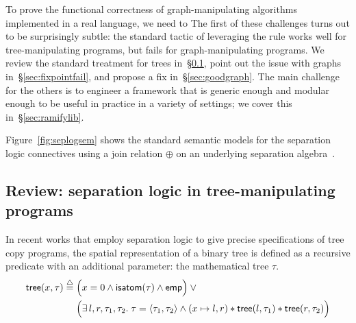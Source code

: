 

To prove the functional correctness of graph-manipulating algorithms implemented in a real language, we need to   
The first of these challenges turns out to be surprisingly subtle: 
the standard tactic of leveraging the  rule 
works well for tree-manipulating programs, but fails for graph-manipulating programs.
We review the standard treatment for trees in~\S\ref{sec:seplogtrees}, 
point out the issue with graphs in~\S\ref{sec:fixpointfail},
and propose a fix in~\S\ref{sec:goodgraph}.  
The main challenge for the others is to engineer a framework that is generic 
enough and modular enough to be useful in practice in a variety of settings; 
we cover this in~\S\ref{sec:ramifylib}.



Figure~\ref{fig:seplogsem} shows the standard semantic models for the separation logic connectives using a join relation $\oplus$ on an underlying separation algebra~\cite{dockins09}.

\subsection{\color{red} Review: separation logic in tree-manipulating programs}
\label{sec:seplogtrees}

In recent works \citep{o2001local, o2012primer}
that employ separation logic to give
precise specifications of tree copy programs, the spatial
representation of a binary tree is defined as a recursive predicate
with an additional parameter: the mathematical tree $\tau$.
\begin{equation}\label{def:tree}
\begin{split}
    \mathsf{tree}(x, \tau)\;\defeq\;
    &\Big(x=0 \wedge \mathsf{isatom}(\tau) \wedge \mathsf{emp}\Big)
    \vee \null \\ &\Big(\exists\,l,r,\tau_1,\tau_2.\; \tau=\langle \tau_1,
    \tau_2 \rangle \wedge (x \mapsto l,r) \scon
    \mathsf{tree}(l, \tau_1) \scon \mathsf{tree}(r, \tau_2)\Big)
    \end{split}
\end{equation}

